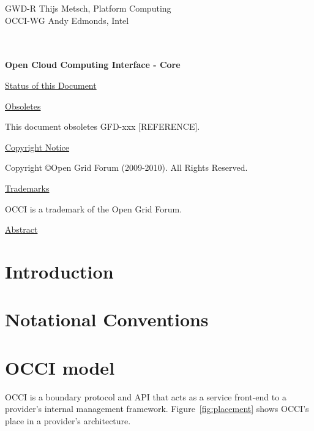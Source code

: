 \documentclass[10pt,a4paper,british]{article}
\begin{document}
\thispagestyle{empty}

GWD-R \hfill  Thijs Metsch, Platform Computing\\
OCCI-WG \hfill  Andy Edmonds, Intel\\
\\
\\

\vspace*{0.5in}

\begin{Large}
\textbf{Open Cloud Computing Interface - Core}
\end{Large}

\vspace*{0.5in}

\underline{Status of this Document}



\underline{Obsoletes}

This document obsoletes GFD-xxx [REFERENCE].

\underline{Copyright Notice}

Copyright \copyright Open Grid Forum (2009-2010). All Rights Reserved.

\underline{Trademarks}

OCCI is a trademark of the Open Grid Forum.

\underline{Abstract}



\newpage
\tableofcontents
\newpage

\section{Introduction}


\section{Notational Conventions}


\section{OCCI model}
OCCI is a boundary protocol and API
that acts as a service front-end to a provider's internal management
framework. Figure~\ref{fig:placement} shows OCCI's place in a
provider's architecture.
\end{document}
